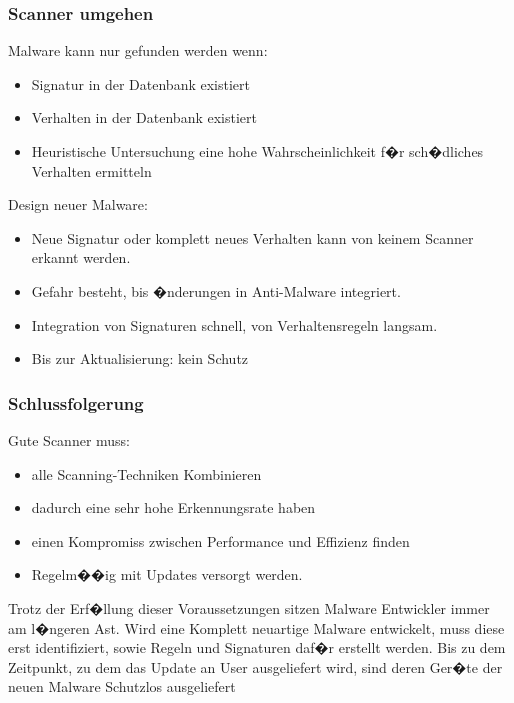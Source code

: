 \documentclass{beamer}
\begin{document}
\begin{frame}
	\frametitle{Scanner umgehen}
	Malware kann nur gefunden werden wenn:
	\begin{itemize}
		\item Signatur in der Datenbank existiert
		\item Verhalten in der Datenbank existiert
		\item Heuristische Untersuchung eine hohe Wahrscheinlichkeit f�r sch�dliches Verhalten ermitteln
	\end{itemize}
	Design neuer Malware:
	\begin{itemize}
		\item Neue Signatur oder komplett neues Verhalten kann von keinem Scanner erkannt werden.
		\item Gefahr besteht, bis �nderungen in Anti-Malware integriert.
		\item Integration von Signaturen schnell, von Verhaltensregeln langsam.
		\item Bis zur Aktualisierung: kein Schutz
	\end{itemize}
	
	
	
	
\end{frame}



\begin{frame}
	\frametitle{Schlussfolgerung}
	Gute Scanner muss:
	\begin{itemize}
		\item alle Scanning-Techniken Kombinieren
		\item dadurch eine sehr hohe Erkennungsrate haben
		\item einen Kompromiss zwischen Performance und Effizienz finden
		\item Regelm��ig mit Updates versorgt werden.
	\end{itemize}
	\begin{block}{}
		Trotz der Erf�llung dieser Voraussetzungen sitzen Malware Entwickler immer am l�ngeren Ast. Wird eine Komplett neuartige Malware entwickelt, muss diese erst identifiziert, sowie Regeln und Signaturen daf�r erstellt werden. Bis zu dem Zeitpunkt, zu dem das Update an User ausgeliefert wird, sind deren Ger�te der neuen Malware Schutzlos ausgeliefert
		
	\end{block}



\end{frame}
\end{document}
